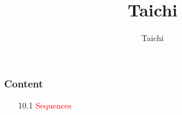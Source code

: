 \documentclass[serif,mathserif]{beamer}
\author[frame work]{Taichi}
\title[taichi\hspace{2em}\insertframenumber/\inserttotalframenumber]{Taichi}
\begin{document}
\begin{CJK}{UTF8}{gbsn}
\maketitle


\begin{frame}
  \frametitle{Content}
  \begin{enumerate}
  \item[10.1] \textcolor{red}{Sequences}
  \end{enumerate}
\end{frame}



\end{CJK}
\end{document}
